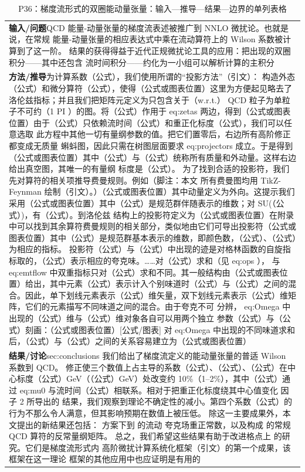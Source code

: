 \documentclass[UTF8,11pt,oneside]{ctexbook}
\begin{document}
\begin{table}[htbp]
  \centering
  \caption*{P36：梯度流形式的双圈能动量张量：输入—推导—结果—边界的单列表格}
  \small
  \begin{tabular}{@{}p{}@{}}
    \toprule
    \textbf{输入/问题}\quad QCD 能量-动量张量的梯度流表述被推广到 NNLO 微扰论。也就是说，在常规 能量-动量张量的相应表达式中乘在流动算符上的 Wilson 系数被计算到了这一阶。 结果的获得得益于近代正规微扰论工具的应用：把出现的双圈积分——其中还包含 流时间积分——约化为一小组可以解析计算的主积分 \\
    \textbf{方法/推导}\quad 为计算系数（公式），我们使用所谓的``投影方法''（引文）： 构造外态（公式）和微分算符（公式），使得（公式或图表位置）这里为方便起见略去了洛伦兹指标；并且我们把矩阵元定义为只包含关于（w.r.t.） QCD 粒子为单粒子不可约（1 PI ）的图。将（公式）作用于 eq:zetas 两边，得到（公式或图表位置）由于（公式）只依赖流时间（公式）和重正化标度（公式），我们可以任意选取 此方程中其他一切有量纲参数的值。把它们置零后，右边所有高阶修正都变成无质量 蝌蚪图，因此只需在树图层面要求 eq:projectors 成立。于是得到（公式或图表位置）其中（公式）与（公式）统称所有质量和外动量。这样右边给出真空图，其唯一的有量纲 标度是（公式）。 为了找到合适的投影符，我们先对算符的相关项推导费曼规则。例如（脚注：本文 所有费曼图均用 TikZ-Feynman 绘制（引文）。）（公式或图表位置）其中动量定义为外向。这提示我们采用（公式或图表位置）其中（公式）是规范群伴随表示的维数；对 SU(（公式）)，有（公式）。到洛伦兹 结构上的投影符定义为（公式或图表位置）在附录中可以找到其余算符费曼规则的相关部分，类似地由它们可导出投影符（公式或图表位置）其中（公式）是规范群基本表示的维数，即颜色数，（公式）、（公式）为相应的指标。 投影符（公式）与（公式）中出现的迹是对格林函数的自旋指标取的，（公式）表示相应的夸克味。……对（公式）求和（见 eq:ops ）， 与 eq:emtflow 中双重指标只对（公式）求和不同。其一般结构由（公式或图表位置）给出，其中元素（公式）表示计入个别味道时（公式）与（公式）之间的混合。因此，单下划线元素表示（公式）维矢量，双下划线元素表示（公式）维矩阵，它们的元素描写不同味道之间的混合。由于夸克不可 分辨， eq:Omega 中出现的（公式）维与（公式）维对象各自可以用两个独立 参数（公式）与（公式）刻画：（公式或图表位置）[公式/图表] 对 eq:Omega 中出现的不同味道求和后，（公式）与（公式）之间的关系容易建立为（公式或图表位置） \\
    \textbf{结果/讨论}\quad sec:conclusions 我们给出了梯度流定义的能动量张量的普适 Wilson 系数到 QCD。 修正使三个数值上占主导的系数（公式）、（公式）、（公式）在中心标度（公式）GeV（（公式）GeV）处改变约 10\%（1–2\%），其中（公式）通过 eq:mu0 与流时间（公式）相联系。相对于把重正化标度绕其中心值变化 因子 2 所导出的 结果，我们观察到理论不确定性的减小。第四个系数（公式）的行为不那么令人满意，但其影响预期在数值上被压低。 除这一主要成果外，本文提出的新结果还包括： 方案下到 的流动 夸克场重正常数，以及构成 的常规 QCD 算符的反常量纲矩阵。 总之，我们希望这些结果有助于改进格点上 的研究。它们是梯度流形式内 高阶微扰计算系统化框架（引文）的第一个成果，该框架在这一理论 框架的其他应用中也应证明是有用的 \\

\end{tabular}
\end{table}
\end{document}
